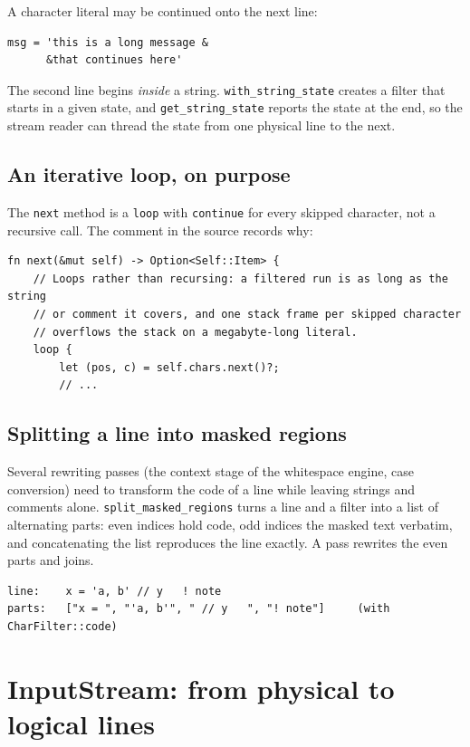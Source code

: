 \documentclass[11pt,a4paper,openany]{book}
\newcommand{\code}[1]{\texttt{\small #1}}
\begin{document}
A character literal may be continued onto the next line:

\begin{lstlisting}[style=fortran]
msg = 'this is a long message &
      &that continues here'
\end{lstlisting}

The second line begins \emph{inside} a string. \code{with\_string\_state}
creates a filter that starts in a given state, and \code{get\_string\_state}
reports the state at the end, so the stream reader can thread the state from
one physical line to the next.

\subsection{An iterative loop, on purpose}

The \code{next} method is a \code{loop} with \code{continue} for every skipped
character, not a recursive call. The comment in the source records why:

\begin{lstlisting}[style=rust]
fn next(&mut self) -> Option<Self::Item> {
    // Loops rather than recursing: a filtered run is as long as the string
    // or comment it covers, and one stack frame per skipped character
    // overflows the stack on a megabyte-long literal.
    loop {
        let (pos, c) = self.chars.next()?;
        // ...
\end{lstlisting}

\subsection{Splitting a line into masked regions}

Several rewriting passes (the context stage of the whitespace engine, case
conversion) need to transform the code of a line while leaving strings and
comments alone. \code{split\_masked\_regions} turns a line and a filter into a
list of alternating parts: even indices hold code, odd indices the masked text
verbatim, and concatenating the list reproduces the line exactly. A pass
rewrites the even parts and joins.

\begin{lstlisting}[style=plain]
line:    x = 'a, b' // y   ! note
parts:   ["x = ", "'a, b'", " // y   ", "! note"]     (with CharFilter::code)
\end{lstlisting}

\section{InputStream: from physical to logical lines}
\end{document}
